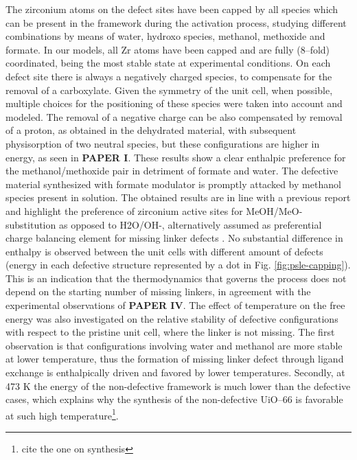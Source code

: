 %
The zirconium atoms on the defect sites have been capped by all species which can be present in the framework during the activation process, studying different combinations by means of water, hydroxo species, methanol, methoxide and formate. In our models, all Zr atoms have been capped and are fully (8--fold) coordinated, being the most stable state at experimental conditions. On each defect site there is always a negatively charged species, to compensate for the removal of a carboxylate. Given the symmetry of the unit cell, when possible, multiple choices for the positioning of these species were taken into account and modeled. The removal of a negative charge can be also compensated by removal of a proton, as obtained in the dehydrated material, with subsequent physisorption of two neutral species, but these configurations are higher in energy, as seen in \textbf{PAPER I}. These results show a clear enthalpic preference for the methanol/methoxide pair in detriment of formate and water. The defective material synthesized with formate modulator is promptly attacked by methanol species present in solution. The obtained results are in line with a previous report \cite{yang2016tuning} and highlight the preference of zirconium active sites for MeOH/MeO- substitution as opposed to H2O/OH-, alternatively assumed as preferential charge balancing element for missing linker defects \cite{trickett2015definitive, ling2016dynamic}. No substantial difference in enthalpy is observed between the unit cells with different amount of defects (energy in each defective structure represented by a dot in Fig. \ref{fig:psle-capping}). This is an indication that the thermodynamics that governs the process does not depend on the starting number of missing linkers, in agreement with the experimental observations of \textbf{PAPER IV}. The effect of temperature on the free energy was also investigated on the relative stability of defective configurations with respect to the pristine unit cell, where the linker is not missing. The first observation is that configurations involving water and methanol are more stable at lower temperature, thus the formation of missing linker defect through ligand exchange is enthalpically driven and favored by lower temperatures. Secondly, at 473 K the energy of the non-defective framework is much lower than the defective cases, which explains why the synthesis of the non-defective UiO--66 is favorable at such high temperature\footnote{cite the one on synthesis}.

